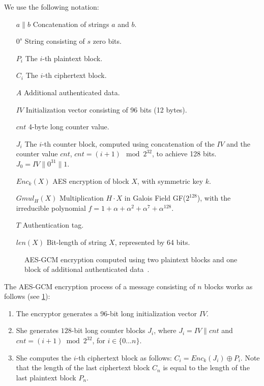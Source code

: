 \documentclass[10pt, a4paper]{article}
\begin{document}
We use the following notation:
\begin{itemize}[leftmargin=1.8cm]
	\item[$a \parallel b$] Concatenation of strings $a$ and $b$.
	\item[$0^s$] String consisting of $s$ zero bits.
	\item[$P_i$] The $i$-th plaintext block.
	\item[$C_i$] The $i$-th ciphertext block.
	\item[$A$] Additional authenticated data.
	\item[$IV$] Initialization vector consisting of 96 bits (12 bytes).
	\item[$cnt$] 4-byte long counter value.
	\item[$J_i$] The $i$-th counter block, computed using concatenation of the $IV$ and the counter value $cnt$, $cnt = (i+1) \mod{2^{32}}$, to achieve 128 bits. $J_0 = IV \parallel 0 ^{31} \parallel 1$.
	\item[$Enc_k(X)$] AES encryption of block $X$, with symmetric key $k$.
	\item[$Gmul_H(X)$] Multiplication $H \cdot X$ in Galois Field GF($2^{128}$), with the irreducible polynomial $f = 1 + \alpha + \alpha^2 + \alpha^7 + \alpha^{128}$.
	\item[$T$] Authentication tag.
	\item[$len(X)$] Bit-length of string $X$, represented by 64 bits.
\end{itemize}


\begin{figure}
	\centering
    \resizebox{0.7\textwidth}{!}{}
	\caption{AES-GCM encryption computed using two plaintext blocks and one block of additional authenticated data~\cite{gcm}.}
	\label{fig:gcm}
\end{figure}




The  AES-GCM encryption process of a message consisting of $n$ blocks works as follows (see \cref{fig:gcm}):
\begin{enumerate}
	\item The encryptor generates a 96-bit long initialization vector $IV$.
	\item She generates $128$-bit long counter blocks $J_i$, where $J_i = IV \parallel cnt$ and $cnt=(i+1)\bmod{2^{32}}$, for $i \in \{0 \ldots n\}$.
	\item She computes the $i$-th ciphertext block as follows: $C_i = Enc_k(J_i) \oplus P_i$. Note that the length of the last ciphertext block $C_n$ is equal to the length of the last plaintext block $P_n$.
\end{enumerate}
\end{document}
